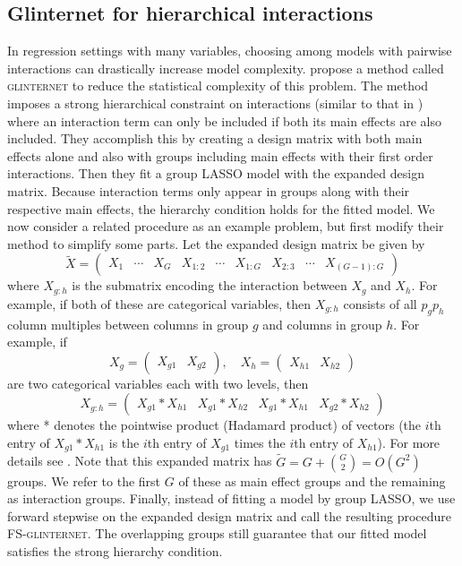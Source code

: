 \documentclass{imsart}
\begin{document}
\subsection{Glinternet for hierarchical interactions}
\label{sec:glint}
In regression settings with many variables, choosing among models with pairwise interactions can drastically increase model complexity. \cite{glint} propose a method called \textsc{glinternet} to reduce the statistical complexity of this problem. The method imposes a strong hierarchical constraint on interactions (similar to that in \cite{bien:hierarchical}) where an interaction term can only be included if both its main effects are also included. They accomplish this by creating a design matrix with both main effects alone and also with groups including main effects with their first order interactions. Then they fit a group LASSO model with the expanded design matrix. Because interaction terms only appear in groups along with their respective main effects, the hierarchy condition holds for the fitted model. We now consider a related procedure as an example problem, but first modify their method to simplify some parts. Let the expanded design matrix be given by
\begin{equation}
\label{eq:glintmat}
\tilde X = \begin{pmatrix} X_1 & \cdots & X_G & X_{1:2} & \cdots & X_{1:G} & X_{2:3} & \cdots & X_{(G-1):G}  \end{pmatrix}
\end{equation}
where $X_{g:h}$ is the submatrix encoding the interaction between $X_g$
and $X_h$. For example, if both of these are categorical variables,
then $X_{g:h}$ consists of all
$p_gp_h$  column multiples between columns in group $g$ and columns
in group $h$. For example, if
\[
X_g = \begin{pmatrix} X_{g1} & X_{g2} \end{pmatrix}, \quad
X_h = \begin{pmatrix} X_{h1} & X_{h2} \end{pmatrix}
\]
are two categorical variables each with two levels, then
\[
X_{g:h} = \begin{pmatrix} X_{g1} * X_{h1} & X_{g1} * X_{h2} & X_{g1} * X_{h1} & X_{g2} * X_{h2} \end{pmatrix}
\]
where * denotes the pointwise product (Hadamard product) of vectors
(the $i$th entry of $X_{g1} * X_{h1}$ is the $i$th entry of $X_{g1}$ times
the $i$th entry of $X_{h1}$). For more details see \cite{glint}.
Note that this expanded matrix has
$\tilde G = G + \binom{G}{2} = O(G^2)$ groups. We refer to the first
$G$ of these as main effect groups and the remaining
as interaction groups. Finally, instead of fitting a
model by group LASSO, we use forward stepwise on the expanded design
matrix and call the resulting procedure FS-\textsc{glinternet}.
The overlapping groups still guarantee that our fitted model
satisfies the strong hierarchy condition. 
\end{document}
